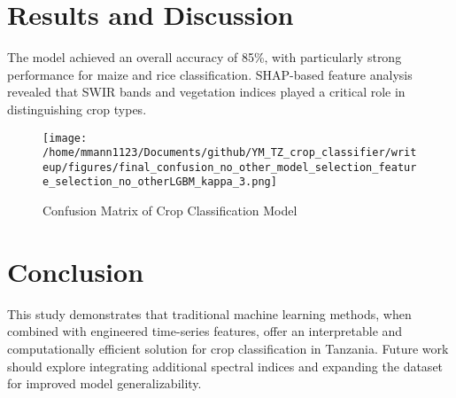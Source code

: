 \documentclass[journal]{IEEEtran}
\begin{document}
\section{Results and Discussion}
The model achieved an overall accuracy of 85\%, with particularly strong performance for maize and rice classification. SHAP-based feature analysis revealed that SWIR bands and vegetation indices played a critical role in distinguishing crop types.

\begin{figure}[H]
    \centering
    \texttt{[image: /home/mmann1123/Documents/github/YM\_TZ\_crop\_classifier/writeup/figures/final\_confusion\_no\_other\_model\_selection\_feature\_selection\_no\_otherLGBM\_kappa\_3.png]}
    \caption{Confusion Matrix of Crop Classification Model}
    \label{fig:confusion}
\end{figure}

\section{Conclusion}
This study demonstrates that traditional machine learning methods, when combined with engineered time-series features, offer an interpretable and computationally efficient solution for crop classification in Tanzania. Future work should explore integrating additional spectral indices and expanding the dataset for improved model generalizability.



\end{document}
